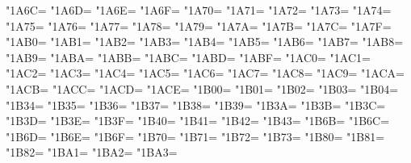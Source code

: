 \XeTeXcharclass"1A6C=\KclassCM
\XeTeXcharclass"1A6D=\KclassCM
\XeTeXcharclass"1A6E=\KclassCM
\XeTeXcharclass"1A6F=\KclassCM
\XeTeXcharclass"1A70=\KclassCM
\XeTeXcharclass"1A71=\KclassCM
\XeTeXcharclass"1A72=\KclassCM
\XeTeXcharclass"1A73=\KclassCM
\XeTeXcharclass"1A74=\KclassCM
\XeTeXcharclass"1A75=\KclassCM
\XeTeXcharclass"1A76=\KclassCM
\XeTeXcharclass"1A77=\KclassCM
\XeTeXcharclass"1A78=\KclassCM
\XeTeXcharclass"1A79=\KclassCM
\XeTeXcharclass"1A7A=\KclassCM
\XeTeXcharclass"1A7B=\KclassCM
\XeTeXcharclass"1A7C=\KclassCM
\XeTeXcharclass"1A7F=\KclassCM
\XeTeXcharclass"1AB0=\KclassCM
\XeTeXcharclass"1AB1=\KclassCM
\XeTeXcharclass"1AB2=\KclassCM
\XeTeXcharclass"1AB3=\KclassCM
\XeTeXcharclass"1AB4=\KclassCM
\XeTeXcharclass"1AB5=\KclassCM
\XeTeXcharclass"1AB6=\KclassCM
\XeTeXcharclass"1AB7=\KclassCM
\XeTeXcharclass"1AB8=\KclassCM
\XeTeXcharclass"1AB9=\KclassCM
\XeTeXcharclass"1ABA=\KclassCM
\XeTeXcharclass"1ABB=\KclassCM
\XeTeXcharclass"1ABC=\KclassCM
\XeTeXcharclass"1ABD=\KclassCM
\XeTeXcharclass"1ABF=\KclassCM
\XeTeXcharclass"1AC0=\KclassCM
\XeTeXcharclass"1AC1=\KclassCM
\XeTeXcharclass"1AC2=\KclassCM
\XeTeXcharclass"1AC3=\KclassCM
\XeTeXcharclass"1AC4=\KclassCM
\XeTeXcharclass"1AC5=\KclassCM
\XeTeXcharclass"1AC6=\KclassCM
\XeTeXcharclass"1AC7=\KclassCM
\XeTeXcharclass"1AC8=\KclassCM
\XeTeXcharclass"1AC9=\KclassCM
\XeTeXcharclass"1ACA=\KclassCM
\XeTeXcharclass"1ACB=\KclassCM
\XeTeXcharclass"1ACC=\KclassCM
\XeTeXcharclass"1ACD=\KclassCM
\XeTeXcharclass"1ACE=\KclassCM
\XeTeXcharclass"1B00=\KclassCM
\XeTeXcharclass"1B01=\KclassCM
\XeTeXcharclass"1B02=\KclassCM
\XeTeXcharclass"1B03=\KclassCM
\XeTeXcharclass"1B04=\KclassCM
\XeTeXcharclass"1B34=\KclassCM
\XeTeXcharclass"1B35=\KclassCM
\XeTeXcharclass"1B36=\KclassCM
\XeTeXcharclass"1B37=\KclassCM
\XeTeXcharclass"1B38=\KclassCM
\XeTeXcharclass"1B39=\KclassCM
\XeTeXcharclass"1B3A=\KclassCM
\XeTeXcharclass"1B3B=\KclassCM
\XeTeXcharclass"1B3C=\KclassCM
\XeTeXcharclass"1B3D=\KclassCM
\XeTeXcharclass"1B3E=\KclassCM
\XeTeXcharclass"1B3F=\KclassCM
\XeTeXcharclass"1B40=\KclassCM
\XeTeXcharclass"1B41=\KclassCM
\XeTeXcharclass"1B42=\KclassCM
\XeTeXcharclass"1B43=\KclassCM
\XeTeXcharclass"1B6B=\KclassCM
\XeTeXcharclass"1B6C=\KclassCM
\XeTeXcharclass"1B6D=\KclassCM
\XeTeXcharclass"1B6E=\KclassCM
\XeTeXcharclass"1B6F=\KclassCM
\XeTeXcharclass"1B70=\KclassCM
\XeTeXcharclass"1B71=\KclassCM
\XeTeXcharclass"1B72=\KclassCM
\XeTeXcharclass"1B73=\KclassCM
\XeTeXcharclass"1B80=\KclassCM
\XeTeXcharclass"1B81=\KclassCM
\XeTeXcharclass"1B82=\KclassCM
\XeTeXcharclass"1BA1=\KclassCM
\XeTeXcharclass"1BA2=\KclassCM
\XeTeXcharclass"1BA3=\KclassCM
